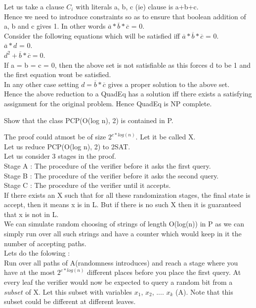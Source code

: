 \documentclass[12pt]{exam}
\begin{document}
\begin{questions}
\begin{solution}
Let us take a clause $C_i$ with literals a, b, c (ie)
clause is a+b+c.\\
Hence we need to introduce constraints so as to
ensure that boolean addition of a, b and c gives 1. In other
words $\overline{a}*\overline{b}*\overline{c}$ = 0.\\
Consider the following equations which will be satisfied
iff $\overline{a}*\overline{b}*\overline{c}$ = 0.\\

$\overline{a}*d$ = 0.\\
$d^2 + \overline{b}*\overline{c} = 0$.\\

If a = b = c = 0, then the above set is not satisfiable as this
forces d to be 1 and the first equation wont be satisfied.\\
In any other case setting $d = \overline{b}*\overline{c}$
gives a proper solution to the above set.\\

Hence the above reduction to a QuadEq has a solution iff there
exists a satisfying assignment for the original problem.
Hence QuadEq is NP complete.

\end{solution}
\question[10] Show that the class PCP(O(log n), 2) is contained in P.
\begin{solution}

The proof could atmost be of size $2^{c*log(n)}$. Let it be called X.\\
Let us reduce PCP(O(log n), 2) to 2SAT.\\
Let us consider 3 stages in the proof.\\
Stage A : The procedure of the verifier before it asks the first query.\\
Stage B : The procedure of the verifier before it asks the second query.\\
Stage C : The procedure of the verifier until it accepts.\\
If there exists an X such that for all these randomization stages, the final
state is accept, then it means x is in L. But if there is no such X
then it is guaranteed that x is not in L.\\

We can simulate random choosing of strings of length O(log(n)) in P
as we can simply run over all such strings and have a counter which would
keep in it the number of accepting paths.\\
Lets do the folowing :\\
Run over all paths of A(randomness introduces) and reach a stage where you
have at the most $2^{c*log(n)}$ different places before you place the first query.
At every leaf the verifier would now be expected to query a random bit
from a $subset$ of X. Let this subset with variables
$x_1$, $x_2$, .... $x_k$ (A). Note that this subset could be different at different
leaves.\\


\end{solution}
\end{questions}
\end{document}
